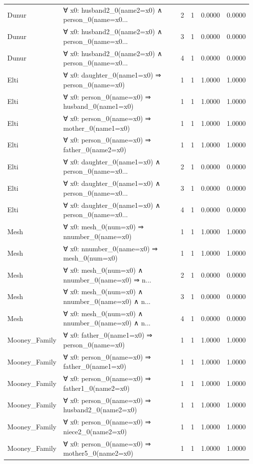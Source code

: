 \documentclass[11pt,a4paper]{article}
\begin{document}
\begin{table}[h!]
\begin{longtable}{|l|p{6cm}|c|c|c|c|}
Dunur & ∀ x0: husband2\_0(name2=x0) ∧ person\_0(name=x0... & 2 & 1 & 0.0000 & 0.0000 \\
Dunur & ∀ x0: husband2\_0(name2=x0) ∧ person\_0(name=x0... & 3 & 1 & 0.0000 & 0.0000 \\
Dunur & ∀ x0: husband2\_0(name2=x0) ∧ person\_0(name=x0... & 4 & 1 & 0.0000 & 0.0000 \\
Elti & ∀ x0: daughter\_0(name1=x0) ⇒ person\_0(name=x0) & 1 & 1 & 1.0000 & 1.0000 \\
Elti & ∀ x0: person\_0(name=x0) ⇒ husband\_0(name1=x0) & 1 & 1 & 1.0000 & 1.0000 \\
Elti & ∀ x0: person\_0(name=x0) ⇒ mother\_0(name1=x0) & 1 & 1 & 1.0000 & 1.0000 \\
Elti & ∀ x0: person\_0(name=x0) ⇒ father\_0(name2=x0) & 1 & 1 & 1.0000 & 1.0000 \\
Elti & ∀ x0: daughter\_0(name1=x0) ∧ person\_0(name=x0... & 2 & 1 & 0.0000 & 0.0000 \\
Elti & ∀ x0: daughter\_0(name1=x0) ∧ person\_0(name=x0... & 3 & 1 & 0.0000 & 0.0000 \\
Elti & ∀ x0: daughter\_0(name1=x0) ∧ person\_0(name=x0... & 4 & 1 & 0.0000 & 0.0000 \\
Mesh & ∀ x0: mesh\_0(num=x0) ⇒ nnumber\_0(name=x0) & 1 & 1 & 1.0000 & 1.0000 \\
Mesh & ∀ x0: nnumber\_0(name=x0) ⇒ mesh\_0(num=x0) & 1 & 1 & 1.0000 & 1.0000 \\
Mesh & ∀ x0: mesh\_0(num=x0) ∧ nnumber\_0(name=x0) ⇒ n... & 2 & 1 & 0.0000 & 0.0000 \\
Mesh & ∀ x0: mesh\_0(num=x0) ∧ nnumber\_0(name=x0) ∧ n... & 3 & 1 & 0.0000 & 0.0000 \\
Mesh & ∀ x0: mesh\_0(num=x0) ∧ nnumber\_0(name=x0) ∧ n... & 4 & 1 & 0.0000 & 0.0000 \\
Mooney_Family & ∀ x0: father\_0(name1=x0) ⇒ person\_0(name=x0) & 1 & 1 & 1.0000 & 1.0000 \\
Mooney_Family & ∀ x0: person\_0(name=x0) ⇒ father\_0(name1=x0) & 1 & 1 & 1.0000 & 1.0000 \\
Mooney_Family & ∀ x0: person\_0(name=x0) ⇒ father1\_0(name2=x0) & 1 & 1 & 1.0000 & 1.0000 \\
Mooney_Family & ∀ x0: person\_0(name=x0) ⇒ husband2\_0(name2=x0) & 1 & 1 & 1.0000 & 1.0000 \\
Mooney_Family & ∀ x0: person\_0(name=x0) ⇒ niece2\_0(name2=x0) & 1 & 1 & 1.0000 & 1.0000 \\
Mooney_Family & ∀ x0: person\_0(name=x0) ⇒ mother5\_0(name2=x0) & 1 & 1 & 1.0000 & 1.0000 \\

\end{longtable}
\end{table}
\end{document}
